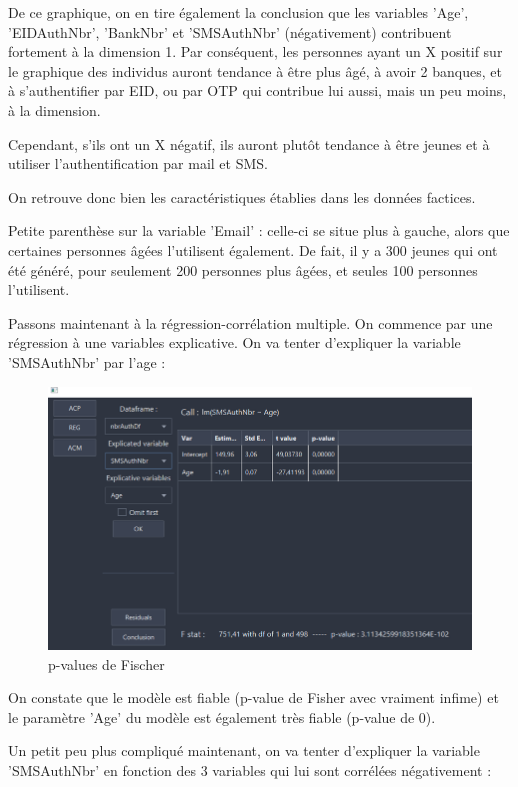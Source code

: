 De ce graphique, on en tire également la conclusion que les variables 'Age', 'EIDAuthNbr', 'BankNbr' et
'SMSAuthNbr' (négativement) contribuent fortement à la dimension 1. Par conséquent, les personnes ayant un X positif sur le graphique des individus auront tendance à être plus âgé, à avoir 2 banques, et
à s'authentifier par EID, ou par OTP qui contribue lui aussi, mais un peu moins, à la dimension.

Cependant, s'ils ont un X négatif, ils auront plutôt tendance à être jeunes et à utiliser l'authentification
par mail et SMS.

On retrouve donc bien les caractéristiques établies dans les données factices.

Petite parenthèse sur la variable 'Email' : celle-ci se situe plus à gauche, alors que certaines personnes
âgées l'utilisent également. De fait, il y a 300 jeunes qui ont été généré, pour seulement 200 personnes
plus âgées, et seules 100 personnes l'utilisent.

Passons maintenant à la régression-corrélation multiple. On commence par une régression à une variables explicative. On va tenter d'expliquer la variable 'SMSAuthNbr' par l'age :

\begin{figure}[H]
    \centering
    \includegraphics[width=\textwidth]{./img/thibault-Tests_Exemple_2.png}
    \caption{p-values de Fischer}
    \label{fig:thibault-ex-02}
\end{figure}

On constate que le modèle est fiable (p-value de Fisher avec vraiment infime) et le paramètre 'Age'
du modèle est également très fiable (p-value de 0).

Un petit peu plus compliqué maintenant, on va tenter d'expliquer la variable 'SMSAuthNbr' en
fonction des 3 variables qui lui sont corrélées négativement :

